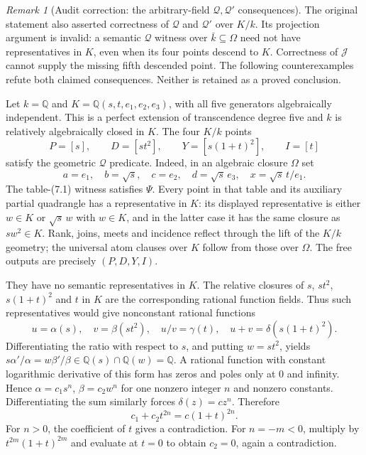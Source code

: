 \documentclass[11pt,oneside]{article}
\theoremstyle{definition}
\theoremstyle{remark}
\newtheorem{remark}[theorem]{Remark}
\newcommand{\Qrel}{\mathcal{Q}}
\newcommand{\Qprel}{\mathcal{Q}'}
\newcommand{\Jrel}{\mathcal{J}}
\begin{document}
\begin{remark}[Audit correction: the arbitrary-field $\Qrel,\Qprel$ consequences]
\label{rem:q-descent-audit}
The original statement also asserted correctness of $\Qrel$ and $\Qprel$ over $K/k$.
Its projection argument is invalid: a semantic $\Qrel$ witness over $\bar k\subseteq\Omega$
need not have representatives in $K$, even when its four points descend to $K$.
Correctness of $\Jrel$ cannot supply the missing fifth descended point.  The following
counterexamples refute both claimed consequences. Neither is retained as a proved
conclusion.

Let $k=\mathbb Q$ and $K=\mathbb Q(s,t,e_1,e_2,e_3)$, with all five generators
algebraically independent.  This is a perfect extension of transcendence degree five
and $k$ is relatively algebraically closed in $K$.  The four $K/k$ points
\[
 P=[s],\qquad D=[st^2],\qquad Y=[s(1+t)^2],\qquad I=[t]
\]
satisfy the geometric $\Qrel$ predicate.  Indeed, in an algebraic closure $\Omega$ set
\[
 a=e_1,\quad b=\sqrt{s},\quad c=e_2,\quad d=\sqrt{s}\,e_3,
 \quad x=\sqrt{s}\,t/e_1.
\]
The table-(7.1) witness satisfies $\Psi$.  Every point in that table and its auxiliary
partial quadrangle has a representative in $K$: its displayed representative is either
$w\in K$ or $\sqrt{s}\,w$ with $w\in K$, and in the latter case it has the same closure
as $sw^2\in K$.  Rank, joins, meets and incidence reflect through the lift of the
$K/k$ geometry; the universal atom clauses over $K$ follow from those over $\Omega$.
The free outputs are precisely $(P,D,Y,I)$.

They have no semantic representatives in $K$.  The relative closures of $s$, $st^2$,
$s(1+t)^2$ and $t$ in $K$ are the corresponding rational function fields.  Thus such
representatives would give nonconstant rational functions
\[
 u=\alpha(s),\quad v=\beta(st^2),\quad u/v=\gamma(t),
 \quad u+v=\delta(s(1+t)^2).
\]
Differentiating the ratio with respect to $s$, and putting $w=st^2$, yields
$s\alpha'/\alpha=w\beta'/\beta\in\mathbb Q(s)\cap\mathbb Q(w)=\mathbb Q$.
A rational function with constant logarithmic derivative of this form has zeros and
poles only at $0$ and infinity.  Hence $\alpha=c_1s^n$, $\beta=c_2w^n$ for one nonzero
integer $n$ and nonzero constants.  Differentiating the sum similarly forces
$\delta(z)=cz^n$.  Therefore
\[
 c_1+c_2t^{2n}=c(1+t)^{2n}.
\]
For $n>0$, the coefficient of $t$ gives a contradiction.  For $n=-m<0$, multiply by
$t^{2m}(1+t)^{2m}$ and evaluate at $t=0$ to obtain $c_2=0$, again a contradiction.


\end{remark}
\end{document}
